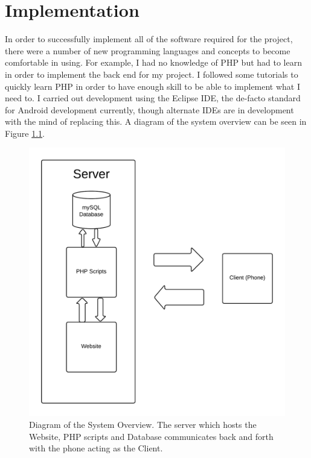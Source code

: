 \documentclass{l4proj}
\begin{document}

\chapter{Implementation}

In order to successfully implement all of the software required for the project, there were a number of new programming languages and concepts to become comfortable in using. For example, I had no knowledge of PHP but had to learn in order to implement the back end for my project. I followed some tutorials to quickly learn PHP in order to have enough skill to be able to implement what I need to. I carried out development using the Eclipse IDE, the de-facto standard for Android development currently, though alternate IDEs are in development with the mind of replacing this. A diagram of the system overview can be seen in Figure \ref{impl:dia1}.

\begin{figure}[H]
\centering
\includegraphics[scale=0.2]{images/diagrams/systemoverview.png}
\caption{Diagram of the System Overview. The server which hosts the Website, PHP scripts and Database communicates back and forth with the phone acting as the Client.}
\label{impl:dia1}
\end{figure}
\end{document}
